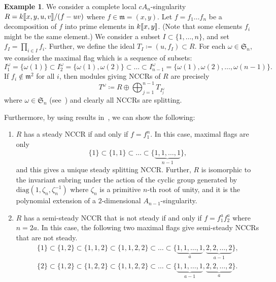 \documentclass[11pt]{amsart}
\theoremstyle{definition}
\newtheorem{exem}[theo]{Example}
\newcommand{\fkm}{\mathfrak{m}}
\newcommand{\fkS}{\mathfrak{S}}
\newcommand{\llbracket}{\mathopen{[\mkern -2.7mu[}}
\newcommand{\rrbracket}{\mathclose{]\mkern -2.7mu]}}
\begin{document}
\begin{exem}\label{cAn-sing}
We consider a complete local $cA_n$-singularity $R=k\llbracket x,y,u,v\rrbracket /(f-uv)$ where $f\in\fkm=(x,y)$. Let $f=f_1\dots f_n$ be a decomposition of $f$ into prime elements in $k\llbracket x,y\rrbracket $. (Note that some elements $f_i$ might be the same element.) We consider a subset $I\subset\{1,\dots,n\}$, and set $f_I=\prod_{i\in I}f_i$. Further, we define the ideal $T_I\coloneqq (u,f_I)\subset R$. For each $\omega\in\fkS_n$, we consider the maximal flag which is a sequence of subsets:
\[
I_1^\omega=\{\omega(1)\}\subset I_2^\omega=\{\omega(1),\omega(2)\}\subset\dots\subset I_{n-1}^\omega=\{\omega(1),\omega(2),\dots,\omega(n-1)\}.
\]
If $f_i\not\in\fkm^2$ for all $i$, then modules giving NCCRs of $R$ are precisely
\[
T^\omega\coloneqq R\oplus\bigoplus^{n-1}_{j=1}T_{I_j^\omega}
\]
where $\omega\in\fkS_n$ (see~\cite[Theorem~5.1]{IW4})
and clearly all NCCRs are splitting.

Furthermore, by using results in~\cite[Section~5]{IW4}, we can show the following:
\begin{enumerate}%
\item $R$ has a steady NCCR if and only if $f=f_1^n$. In this case, maximal flags are only
\[
\{1\}\subset\{1, 1\}\subset\dots\subset\{\underbrace{1,1,\dots,1}_{n-1}\},
\]
and this gives a unique steady splitting NCCR. Further, $R$ is isomorphic to the invariant subring under the action of the cyclic group generated by $\mathrm{diag}(1,\zeta_n,\zeta^{-1}_n)$ where $\zeta_n$ is a primitive $n$-th root of unity, and it is the polynomial extension of a $2$-dimensional $A_{n-1}$-singularity.
\item $R$ has a semi-steady NCCR that is not steady if and only if $f=f_1^af_2^a$ where $n=2a$. In this case, the following two maximal flags give semi-steady NCCRs that are not steady.
\begin{gather*}
\{1\}\subset\{1,2\}\subset\{1,1,2\}\subset\{1,1,2,2\}\subset\dots\subset\{\underbrace{1,1,\dots,1}_{a},\underbrace{2,2,\dots,2}_{a-1}\},
\\
\{2\}\subset\{1,2\}\subset\{1,2,2\}\subset\{1,1,2,2\}\subset\dots\subset\{\underbrace{1,1,\dots,1}_{a-1},\underbrace{2,2,\dots,2}_{a}\}.
\end{gather*}
\end{enumerate}
\end{exem}
\end{document}
